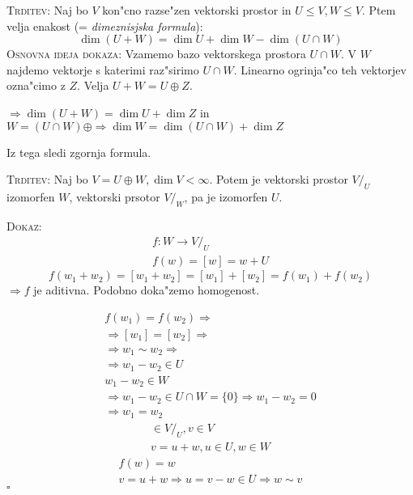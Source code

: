 \textsc{Trditev:} Naj bo $V$ kon"cno razse"zen vektorski prostor in $U \leq V, W \leq V$. Ptem velja enakost (= \emph{dimeznisjska formula}):
\begin{equation*}
\dim (U + W) = \dim U + \dim W - \dim (U \cap W)
\end{equation*}
\textsc{Osnovna ideja dokaza:} Vzamemo bazo vektorskega prostora $U \cap W$. V $W$ najdemo vektorje s katerimi raz"sirimo $U \cap W$. Linearno ogrinja"co teh vektorjev ozna"cimo z $Z$. Velja $U + W = U \oplus Z$.

$\Rightarrow \dim (U + W) = \dim U + \dim Z$ in \\
$W = (U \cap W) \oplus  \Rightarrow \dim W = \dim (U \cap W) + \dim Z$

Iz tega sledi zgornja formula.

\textsc{Trditev:} Naj bo $V = U \oplus W, \dim V < \infty$. Potem je vektorski prostor $V/_U$ izomorfen $W$, vektorski prsotor $V/_W$, pa je izomorfen $U$.

\textsc{Dokaz:}
\begin{gather*}
	f: W \to V/_U \\
	f(w) = [w] = w + U
\end{gather*}
\begin{equation*}
f (w_1 + w_2) = [w_1 + w_2] = [w_1] + [w_2] = f(w_1) + f(w_2)
\end{equation*}
$\Rightarrow f$ je aditivna. Podobno doka"zemo homogenost.

\begin{gather*}
f(w_1) = f(w_2) \Rightarrow \\
\Rightarrow [w_1] = [w_2] \Rightarrow \\
\Rightarrow w_1 \sim w_2 \Rightarrow \\
\Rightarrow w_1 - w_2 \in U \\
w_1 - w_2 \in W \\
\Rightarrow w_1 - w_2 \in U \cap W = \{0\} \Rightarrow w_1 - w_2 = 0 \\
\Rightarrow w_1 = w_2
\end{gather*}
\begin{gather*}
[v] \in V/_U, v \in V \\
v = u + w, u \in U, w \in W
\end{gather*}
\begin{gather*}
f(w) = w \\
v = u + w \Rightarrow u = v - w \in U \Rightarrow w \sim v
\end{gather*}
\hfill $\square$


